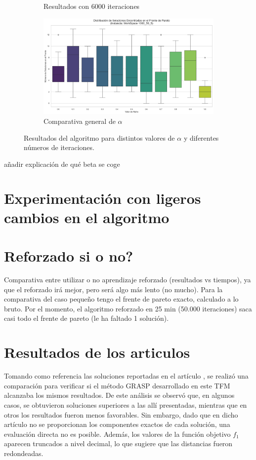 \documentclass[12pt,a4paper]{book}
\begin{document}
\begin{figure}[H]
\begin{subfigure}{0.45\textwidth}
        \caption{Resultados con 6000 iteraciones}
        \label{fig:beta_6000}
    \end{subfigure}
    \hfill
    \begin{subfigure}{0.45\textwidth}
        \centering
        \includegraphics[width=\linewidth]{images_finetuning/alphas}
        \caption{Comparativa general de $\alpha$}
        \label{fig:betas}
    \end{subfigure}
    \caption{Resultados del algoritmo para distintos valores de $\alpha$ y diferentes números de iteraciones.}
    \label{fig:resultados_beta}
\end{figure}

\color{red} añadir explicación de qué beta se coge \color{black}

\section{Experimentación con ligeros cambios en el algoritmo}

\section{Reforzado si o no?}
Comparativa entre utilizar o no aprendizaje reforzado (resultados vs tiempos), ya que el reforzado irá mejor, pero será algo más lento (no mucho).
Para la comparativa del caso pequeño tengo el frente de pareto exacto, calculado a lo bruto. Por el momento, el algoritmo reforzado en 25 min (50.000 iteraciones) saca casi todo el frente de pareto (le ha faltado 1 solución).

\section{Resultados de los articulos}
\label{sec:articulo2}
Tomando como referencia las soluciones reportadas en el artículo \cite{k-Balanced_2}, se realizó una comparación para verificar si el método GRASP desarrollado en este TFM alcanzaba los mismos resultados. De este análisis se observó que, en algunos casos, se obtuvieron soluciones superiores a las allí presentadas, mientras que en otros los resultados fueron menos favorables.
Sin embargo, dado que en dicho artículo no se proporcionan los componentes exactos de cada solución, una evaluación directa no es posible. 
Además, los valores de la función objetivo $f_1$ aparecen truncados a nivel decimal, lo que sugiere que las distancias fueron redondeadas.
\end{document}

